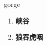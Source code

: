 
\begin{frame}
{\huge gorge}
\begin{center}
\begin{enumerate}\Large
  \item \textbf{峡谷}
  \item \textbf{狼吞虎咽}
\end{enumerate}
\end{center}
\end{frame}
